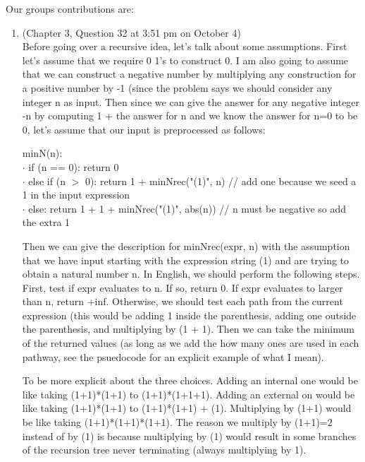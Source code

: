\documentclass{article}
\begin{document}
Our groups contributions are:
\begin{enumerate}
    \item (Chapter 3, Question 32 at 3:51 pm on October 4) \\
        Before going over a recursive idea, let's talk about some assumptions.
        First let's assume that we require 0 1's to construct 0.
        I am also going to assume that we can construct a negative number by multiplying any construction for a positive number by -1 (since the problem says we should consider any integer n as input.
        Then since we can give the answer for any negative integer -n by computing 1 + the answer for n and we know the answer for n=0 to be 0, let's assume that our input is preprocessed as follows:

        \begin{algorithm}
            minN(n): \\
            $\cdot$ \hspace{1.5em} if (n == 0): return 0 \\
            $\cdot$ \hspace{1.5em} else if (n $>$ 0): return 1 + minNrec("(1)", n) // add one because we seed a 1 in the input expression \\
            $\cdot$ \hspace{1.5em} else: return 1 + 1 + minNrec("(1)", abs(n)) // n must be negative so add the extra 1
        \end{algorithm}

        Then we can give the description for minNrec(expr, n) with the assumption that we have input starting with the expression string (1) and are trying to obtain a natural number n.
        In English, we should perform the following steps.
        First, test if expr evaluates to n.
        If so, return 0. If expr evaluates to larger than n, return +inf. Otherwise, we should test each path from the current expression (this would be adding 1 inside the parenthesis, adding one outside the parenthesis, and multiplying by (1 + 1).
        Then we can take the minimum of the returned values (as long as we add the how many ones are used in each pathway, see the psuedocode for an explicit example of what I mean).

        To be more explicit about the three choices.
        Adding an internal one would be like taking (1+1)*(1+1) to (1+1)*(1+1+1).
        Adding an external on would be like taking (1+1)*(1+1) to (1+1)*(1+1) + (1).
        Multiplying by (1+1) would be like taking (1+1)*(1+1)*(1+1).
        The reason we multiply by (1+1)=2 instead of by (1) is because multiplying by (1) would result in some branches of the recursion tree never terminating (always multiplying by 1).


\end{enumerate}
\end{document}
